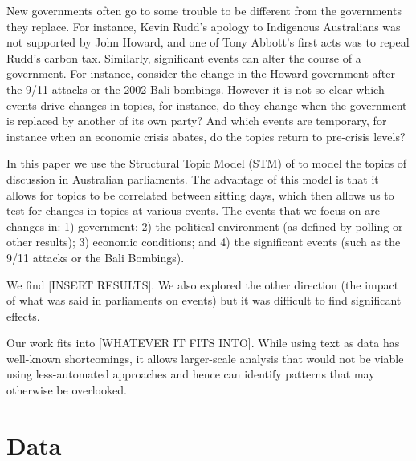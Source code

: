 \documentclass[12pt,]{article}
\begin{document}
New governments often go to some trouble to be different from the
governments they replace. For instance, Kevin Rudd's apology to
Indigenous Australians was not supported by John Howard, and one of Tony
Abbott's first acts was to repeal Rudd's carbon tax. Similarly,
significant events can alter the course of a government. For instance,
consider the change in the Howard government after the 9/11 attacks or
the 2002 Bali bombings. However it is not so clear which events drive
changes in topics, for instance, do they change when the government is
replaced by another of its own party? And which events are temporary,
for instance when an economic crisis abates, do the topics return to
pre-crisis levels?

In this paper we use the Structural Topic Model (STM) of
\citet{RobertsStewartAiroldi2016} to model the topics of discussion in
Australian parliaments. The advantage of this model is that it allows
for topics to be correlated between sitting days, which then allows us
to test for changes in topics at various events. The events that we
focus on are changes in: 1) government; 2) the political environment (as
defined by polling or other results); 3) economic conditions; and 4) the
significant events (such as the 9/11 attacks or the Bali Bombings).

We find {[}INSERT RESULTS{]}. We also explored the other direction (the
impact of what was said in parliaments on events) but it was difficult
to find significant effects.

Our work fits into {[}WHATEVER IT FITS INTO{]}. While using text as data
has well-known shortcomings, it allows larger-scale analysis that would
not be viable using less-automated approaches and hence can identify
patterns that may otherwise be overlooked.

\section{Data}\label{data}
\end{document}
